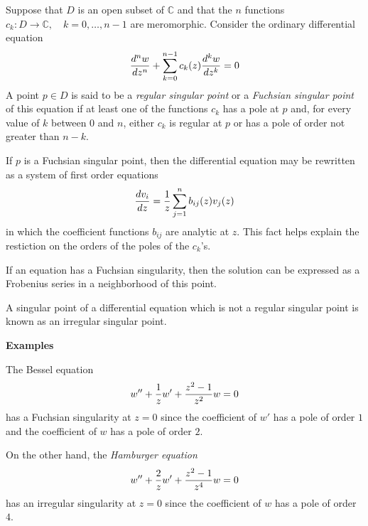 \documentclass[12pt]{article}
\begin{document}
Suppose that $D$ is an open subset of $\mathbb{C}$ and that the $n$ functions $c_k 
\colon D \to \mathbb{C}, \quad k = 0, \ldots, n-1$ are meromorphic.  Consider the ordinary differential equation
 $${d^n w \over dz^n} + \sum_{k=0}^{n-1} c_k (z) {d^k w \over dz^k} = 0$$
A point $p \in D$ is said to be a \emph{regular singular point} or a \emph{Fuchsian singular point} of this equation if at least one of the functions $c_k$ has a pole at $p$ and, for every value of $k$ between $0$ and $n$, either $c_k$ is regular at $p$ or has a pole of order not greater than $n-k$.  

If $p$ is a Fuchsian singular point, then the differential equation may be rewritten as a system of first order equations
 $${d v_i \over dz} = {1 \over z} \sum_{j=1}^{n} b_{ij}(z) v_j (z)$$
in which the coefficient functions $b_{ij}$ are analytic at $z$.  This fact helps explain the restiction on the orders of the poles of the $c_k$'s.

If an equation has a Fuchsian singularity, then the solution can be expressed as a Frobenius series in a neighborhood of this point.

A singular point of a differential equation which is not a regular singular point is known as an irregular singular point.

{\bf Examples}

The Bessel equation
 $$w'' +  {1 \over z} w' + {z^2 - 1 \over z^2} w = 0$$
has a Fuchsian singularity at $z=0$ since the coefficient of $w'$ has a pole of order $1$ and the coefficient of $w$ has a pole of order $2$.

On the other hand, the \emph{Hamburger equation}
 $$w'' + {2 \over z} w' + {z^2 - 1 \over z^4} w = 0$$
has an irregular singularity at $z=0$ since the coefficient of $w$ has a pole of order $4$.
\end{document}
